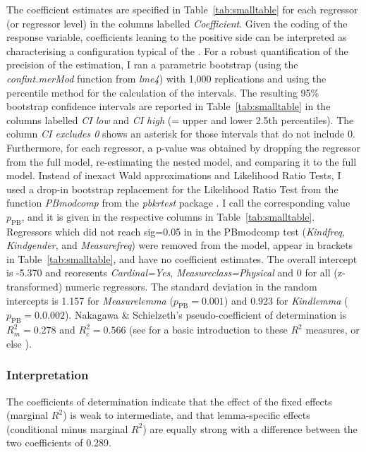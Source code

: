 The coefficient estimates are specified in Table~\ref{tab:smalltable} for each regressor (or regressor level) in the columns labelled \textit{Coefficient}.
Given the coding of the response variable, coefficients leaning to the positive side can be interpreted as characterising a configuration typical of the \PGCd.
For a robust quantification of the precision of the estimation, I ran a parametric bootstrap (using the \mbox{\textit{confint.merMod}} function from \textit{lme4}) with 1,000 replications and using the percentile method for the calculation of the intervals.
The resulting 95\% bootstrap confidence intervals are reported in Table~\ref{tab:smalltable} in the columns labelled \textit{CI low} and \textit{CI high} (= upper and lower 2.5th percentiles).
The column \textit{CI excludes 0} shows an asterisk for those intervals that do not include 0.
Furthermore, for each regressor, a p-value was obtained by dropping the regressor from the full model, re-estimating the nested model, and comparing it to the full model.
Instead of inexact Wald approximations and Likelihood Ratio Tests, I used a drop-in bootstrap replacement for the Likelihood Ratio Test from the function \textit{PBmodcomp} from the \textit{pbkrtest} package \citep{HalekohHojsgaard2014}.
I call the corresponding value $p_{\text{PB}}$, and it is given in the respective columns in Table~\ref{tab:smalltable}.
Regressors which did not reach sig=0.05 in in the PBmodcomp test (\textit{Kindfreq}, \textit{Kindgender}, and \textit{Measurefreq}) were removed from the model, appear in brackets in Table~\ref{tab:smalltable}, and have no coefficient estimates.
The overall intercept is -5.370 and reoresents \textit{Cardinal=Yes}, \textit{Measureclass=Physical} and 0 for all (z-transformed) numeric regressors.
The standard deviation in the random intercepts is 1.157 for \textit{Measurelemma} ($p_{\text{PB}}=0.001$) and 0.923 for \textit{Kindlemma} ($p_{\text{PB}}=0.0.002$).
Nakagawa \& Schielzeth's pseudo-coefficient of determination is $R_m^2=0.278$ and $R^2_c=0.566$ (see \citealp{Gries2015} for a basic introduction to these $R^2$ measures, or else \citealp{NakagawaSchielzeth2013}).

\subsubsection{Interpretation}

The coefficients of determination indicate that the effect of the fixed effects (marginal $R^2$) is weak to intermediate, and that lemma-specific effects (conditional minus marginal $R^2$) are equally strong with a difference between the two coefficients of 0.289.

